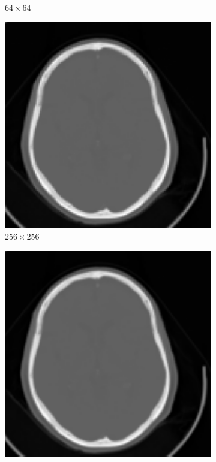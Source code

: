 \documentclass[letterpaper,12pt]{article}
\theoremstyle{plain}
\begin{document}
\begin{figure}[H]
\begin{subfigure}[h]{0.24\textwidth}
            \caption{$64\times64$} 
         \end{subfigure}
         \begin{subfigure}[h]{0.24\textwidth}
            \centering
            \includegraphics[width=\textwidth]{Figuras/Interpolate_bilinear_f=2.png}
            \caption{$256\times256$} 
         \end{subfigure}
         \begin{subfigure}[h]{0.24\textwidth}
            \centering
            \includegraphics[width=\textwidth]{Figuras/Interpolate_bilinear_f=8.png}

\end{subfigure}
\end{figure}
\end{document}

